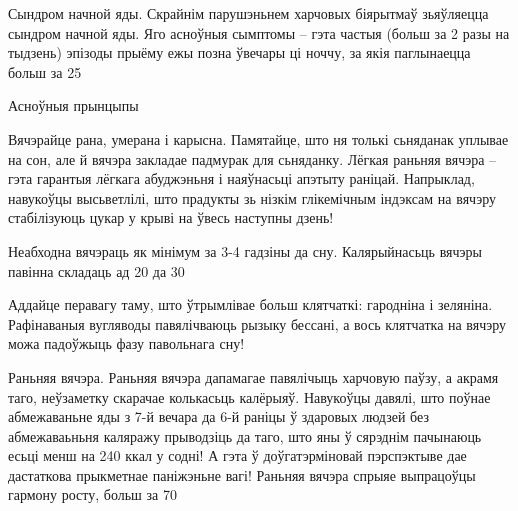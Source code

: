 Сындром начной яды.
Скрайнім парушэньнем харчовых біярытмаў зьяўляецца сындром начной яды. Яго асноўныя сымптомы – гэта частыя (больш за 2 разы на тыдзень) эпізоды прыёму ежы позна ўвечары ці ноччу, за якія паглынаецца больш за 25%

Асноўныя прынцыпы

Вячэрайце рана, умерана і карысна.
Памятайце, што ня толькі сьняданак уплывае на сон, але й вячэра закладае падмурак для сьняданку. Лёгкая раньняя вячэра – гэта гарантыя лёгкага абуджэньня і наяўнасьці апэтыту раніцай. Напрыклад, навукоўцы высьветлілі, што прадукты зь нізкім глікемічным індэксам на вячэру стабілізуюць цукар у крыві на ўвесь наступны дзень!

Неабходна вячэраць як мінімум за 3-4 гадзіны да сну. Калярыйнасьць вячэры павінна складаць ад 20 да 30%

Аддайце перавагу таму, што ўтрымлівае больш клятчаткі: гародніна і зеляніна. Рафінаваныя вугляводы павялічваюць рызыку бессані, а вось клятчатка на вячэру можа падоўжыць фазу павольнага сну!

Раньняя вячэра.
Раньняя вячэра дапамагае павялічыць харчовую паўзу, а акрамя таго, неўзаметку скарачае колькасьць калёрыяў. Навукоўцы давялі, што поўнае абмежаваньне яды з 7-й вечара да 6-й раніцы ў здаровых людзей без абмежаваьньня каляражу прыводзіць да таго, што яны ў сярэднім пачынаюць есьці менш на 240 ккал у содні! А гэта ў доўгатэрміновай пэрспэктыве дае дастаткова прыкметнае паніжэньне вагі! Раньняя вячэра спрыяе выпрацоўцы гармону росту, больш за 70%

